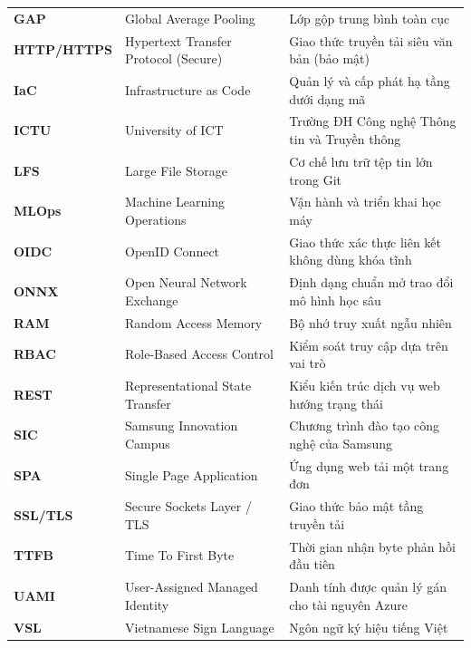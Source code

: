 \begin{center}
\begin{singlespace}
\begin{tabularx}{\textwidth}{l p{5.5cm} X}
\textbf{GAP}          & Global Average Pooling & Lớp gộp trung bình toàn cục \\
\textbf{HTTP/HTTPS}   & Hypertext Transfer Protocol (Secure) & Giao thức truyền tải siêu văn bản (bảo mật) \\
\textbf{IaC}          & Infrastructure as Code & Quản lý và cấp phát hạ tầng dưới dạng mã \\
\textbf{ICTU}         & University of ICT & Trường ĐH Công nghệ Thông tin và Truyền thông \\
\textbf{LFS}          & Large File Storage & Cơ chế lưu trữ tệp tin lớn trong Git \\
\textbf{MLOps}        & Machine Learning Operations & Vận hành và triển khai học máy \\
\textbf{OIDC}         & OpenID Connect & Giao thức xác thực liên kết không dùng khóa tĩnh \\
\textbf{ONNX}         & Open Neural Network Exchange & Định dạng chuẩn mở trao đổi mô hình học sâu \\
\textbf{RAM}          & Random Access Memory & Bộ nhớ truy xuất ngẫu nhiên \\
\textbf{RBAC}         & Role-Based Access Control & Kiểm soát truy cập dựa trên vai trò \\
\textbf{REST}         & Representational State Transfer & Kiểu kiến trúc dịch vụ web hướng trạng thái \\
\textbf{SIC}          & Samsung Innovation Campus & Chương trình đào tạo công nghệ của Samsung \\
\textbf{SPA}          & Single Page Application & Ứng dụng web tải một trang đơn \\
\textbf{SSL/TLS}      & Secure Sockets Layer / TLS & Giao thức bảo mật tầng truyền tải \\
\textbf{TTFB}         & Time To First Byte & Thời gian nhận byte phản hồi đầu tiên \\
\textbf{UAMI}         & User-Assigned Managed Identity & Danh tính được quản lý gán cho tài nguyên Azure \\
\textbf{VSL}          & Vietnamese Sign Language & Ngôn ngữ ký hiệu tiếng Việt \\
\bottomrule
\end{tabularx}
\end{singlespace}
\end{center}
